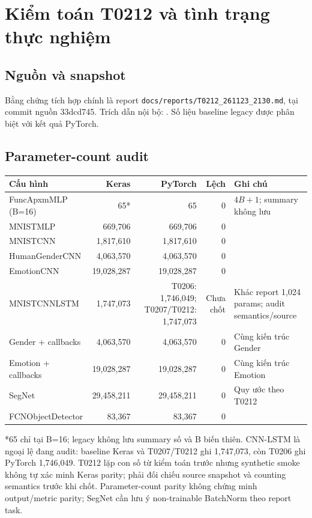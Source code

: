 \chapter{Kiểm toán T0212 và tình trạng thực nghiệm}
\section{Nguồn và snapshot}
Bằng chứng tích hợp chính là report \texttt{docs/reports/T0212\_261123\_2130.md}, tại commit nguồn 33dcd745. Trích dẫn nội bộ: \cite{btl03_t0212_internal}. Số liệu baseline legacy được phân biệt với kết quả PyTorch.

\section{Parameter-count audit}
\begin{longtable}{p{}r r r p{}}
\toprule Cấu hình & Keras & PyTorch & Lệch & Ghi chú \\
\midrule
FuncApxmMLP (B=16) & 65* & 65 & 0 & $4B+1$; summary không lưu \\
MNISTMLP & 669,706 & 669,706 & 0 & \\
MNISTCNN & 1,817,610 & 1,817,610 & 0 & \\
HumanGenderCNN & 4,063,570 & 4,063,570 & 0 & \\
EmotionCNN & 19,028,287 & 19,028,287 & 0 & \\
MNISTCNNLSTM & 1,747,073 & T0206: 1,746,049; T0207/T0212: 1,747,073 & Chưa chốt & Khác report 1,024 params; audit semantics/source \\
Gender + callbacks & 4,063,570 & 4,063,570 & 0 & Cùng kiến trúc Gender \\
Emotion + callbacks & 19,028,287 & 19,028,287 & 0 & Cùng kiến trúc Emotion \\
SegNet & 29,458,211 & 29,458,211 & 0 & Quy ước theo T0212 \\
FCNObjectDetector & 83,367 & 83,367 & 0 & \\
\bottomrule
\end{longtable}
*65 chỉ tại B=16; legacy không lưu summary số và B biến thiên. CNN-LSTM là ngoại lệ đang audit: baseline Keras và T0207/T0212 ghi 1,747,073, còn T0206 ghi PyTorch 1,746,049. T0212 lặp con số từ kiểm toán trước nhưng synthetic smoke không tự xác minh Keras parity; phải đối chiếu source snapshot và counting semantics trước khi chốt. Parameter-count parity không chứng minh output/metric parity; SegNet cần lưu ý non-trainable BatchNorm theo report task.

